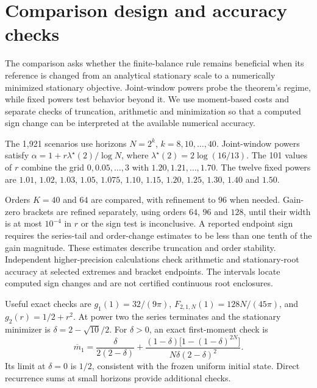 \documentclass[11pt,a4paper]{article}
\begin{document}
\section{Comparison design and accuracy checks}
The comparison asks whether the finite-balance rule remains beneficial when its reference is changed from an analytical stationary scale to a numerically minimized stationary objective. Joint-window powers probe the theorem's regime, while fixed powers test behavior beyond it. We use moment-based costs and separate checks of truncation, arithmetic and minimization so that a computed sign change can be interpreted at the available numerical accuracy.

The 1,921 scenarios use horizons $N=2^k$, $k=8,10,\ldots,40$. Joint-window powers satisfy $\alpha=1+r\lambda^\star(2)/\log N$, where $\lambda^\star(2)=2\log(16/13)$. The 101 values of $r$ combine the grid $0,0.05,\ldots,3$ with $1.20,1.21,\ldots,1.70$. The twelve fixed powers are $1.01$, $1.02$, $1.03$, $1.05$, $1.075$, $1.10$, $1.15$, $1.20$, $1.25$, $1.30$, $1.40$ and $1.50$.

Orders $K=40$ and $64$ are compared, with refinement to $96$ when needed. Gain-zero brackets are refined separately, using orders $64$, $96$ and $128$, until their width is at most $10^{-4}$ in $r$ or the sign test is inconclusive. A reported endpoint sign requires the series-tail and order-change estimates to be less than one tenth of the gain magnitude. These estimates describe truncation and order stability. Independent higher-precision calculations check arithmetic and stationary-root accuracy at selected extremes and bracket endpoints. The intervals locate computed sign changes and are not certified continuous root enclosures.

Useful exact checks are $g_1(1)=32/(9\pi)$, $F_{2,1,N}(1)=128N/(45\pi)$, and $g_2(r)=1/2+r^2$. At power two the series terminates and the stationary minimizer is $\delta=2-\sqrt{10}/2$. For $\delta>0$, an exact first-moment check is
\[
\overline m_1=\frac{\delta}{2(2-\delta)}
+\frac{(1-\delta)\bigl[1-(1-\delta)^{2N}\bigr]}{N\delta(2-\delta)^2}.
\]
Its limit at $\delta=0$ is $1/2$, consistent with the frozen uniform initial state. Direct recurrence sums at small horizons provide additional checks.
\end{document}
